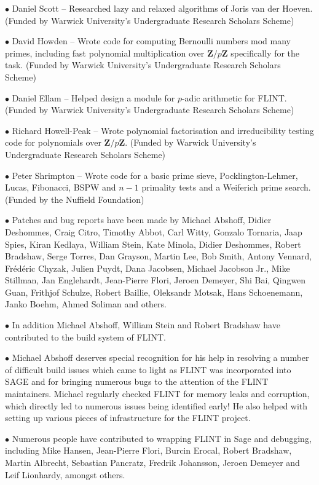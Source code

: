 \documentclass[a4paper,10pt]{book}
\newcommand{\Z}{\mathbf{Z}}%
\begin{document}
$\bullet$ Daniel Scott -- Researched lazy and relaxed algorithms of Joris van
der Hoeven. (Funded by Warwick University's Undergraduate Research Scholars
Scheme)

$\bullet$ David Howden -- Wrote code for computing Bernoulli numbers mod many
primes, including fast polynomial multiplication over $\Z/p\Z$ specifically for
the task. (Funded by Warwick University's Undergraduate Research Scholars
Scheme)

$\bullet$ Daniel Ellam -- Helped design a module for $p$-adic arithmetic for
FLINT. (Funded by Warwick University's Undergraduate Research Scholars Scheme)

$\bullet$ Richard Howell-Peak -- Wrote polynomial factorisation and
irreducibility testing code for polynomials over $\Z/p\Z$. (Funded by Warwick
University's Undergraduate Research Scholars Scheme)

$\bullet$ Peter Shrimpton -- Wrote code for a basic prime sieve,
Pocklington-Lehmer, Lucas, Fibonacci, BSPW and $n-1$ primality tests and a
Weiferich prime search. (Funded by the Nuffield Foundation)

$\bullet$ Patches and bug reports have been made by Michael Abshoff, 
Didier Deshommes, Craig Citro, Timothy Abbot, Carl Witty, Gonzalo Tornaria,
Jaap Spies, Kiran Kedlaya, William Stein, Kate Minola, Didier Deshommes, Robert
Bradshaw, Serge Torres, Dan Grayson, Martin Lee, Bob Smith, Antony Vennard,
Fr\'{e}d\'{e}ric Chyzak, Julien Puydt, Dana Jacobsen, Michael Jacobson Jr.,
Mike Stillman, Jan Englehardt, Jean-Pierre Flori, Jeroen Demeyer, Shi Bai,
Qingwen Guan, Frithjof Schulze, Robert Baillie, Oleksandr Motsak, Hans
Schoenemann, Janko Boehm, Ahmed Soliman and others.

$\bullet$ In addition Michael Abshoff, William Stein and Robert Bradshaw have
contributed to the build system of FLINT.

$\bullet$ Michael Abshoff deserves special recognition for his help in
resolving a number of difficult build issues which came to light as FLINT was
incorporated into SAGE and for bringing numerous bugs to the attention of the
FLINT maintainers. Michael regularly checked FLINT for memory leaks and
corruption, which directly led to numerous issues being identified early!
He also helped with setting up various pieces of infrastructure for the FLINT
project.

$\bullet$ Numerous people have contributed to wrapping FLINT in Sage and
debugging, including Mike Hansen, Jean-Pierre Flori, Burcin Erocal, Robert
Bradshaw, Martin Albrecht, Sebastian Pancratz, Fredrik Johansson, Jeroen
Demeyer and Leif Lionhardy, amongst others.
\end{document}
